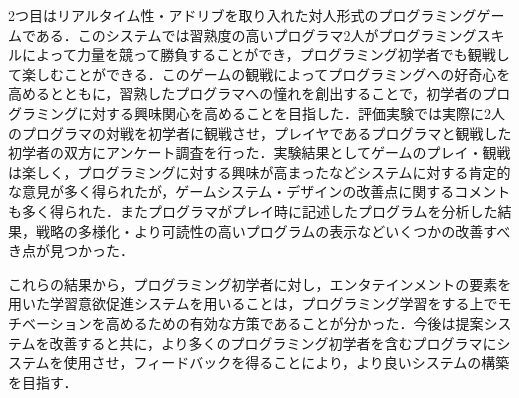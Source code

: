 2つ目はリアルタイム性・アドリブを取り入れた対人形式のプログラミングゲームである．このシステムでは習熟度の高いプログラマ2人がプログラミングスキルによって力量を競って勝負することができ，プログラミング初学者でも観戦して楽しむことができる．このゲームの観戦によってプログラミングへの好奇心を高めるとともに，習熟したプログラマへの憧れを創出することで，初学者のプログラミングに対する興味関心を高めることを目指した．評価実験では実際に2人のプログラマの対戦を初学者に観戦させ，プレイヤであるプログラマと観戦した初学者の双方にアンケート調査を行った．実験結果としてゲームのプレイ・観戦は楽しく，プログラミングに対する興味が高まったなどシステムに対する肯定的な意見が多く得られたが，ゲームシステム・デザインの改善点に関するコメントも多く得られた．またプログラマがプレイ時に記述したプログラムを分析した結果，戦略の多様化・より可読性の高いプログラムの表示などいくつかの改善すべき点が見つかった．

これらの結果から，プログラミング初学者に対し，エンタテインメントの要素を用いた学習意欲促進システムを用いることは，プログラミング学習をする上でモチベーションを高めるための有効な方策であることが分かった．今後は提案システムを改善すると共に，より多くのプログラミング初学者を含むプログラマにシステムを使用させ，フィードバックを得ることにより，より良いシステムの構築を目指す．